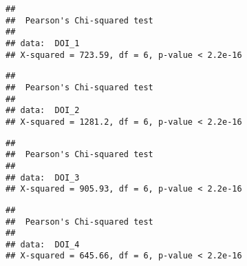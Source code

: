 \documentclass[
]{article}
\newenvironment{Shaded}{\begin{snugshade}}{\end{snugshade}}
\newcommand{\DataTypeTok}[1]{\textcolor[rgb]{0.13,0.29,0.53}{#1}}
\newcommand{\DecValTok}[1]{\textcolor[rgb]{0.00,0.00,0.81}{#1}}
\newcommand{\KeywordTok}[1]{\textcolor[rgb]{0.13,0.29,0.53}{\textbf{#1}}}
\newcommand{\NormalTok}[1]{#1}
\newcommand{\OperatorTok}[1]{\textcolor[rgb]{0.81,0.36,0.00}{\textbf{#1}}}
\newcommand{\OtherTok}[1]{\textcolor[rgb]{0.56,0.35,0.01}{#1}}
\begin{document}
\begin{verbatim}
## 
##  Pearson's Chi-squared test
## 
## data:  DOI_1
## X-squared = 723.59, df = 6, p-value < 2.2e-16
\end{verbatim}

\begin{Shaded}
\end{Shaded}

\begin{verbatim}
## 
##  Pearson's Chi-squared test
## 
## data:  DOI_2
## X-squared = 1281.2, df = 6, p-value < 2.2e-16
\end{verbatim}

\begin{Shaded}
\end{Shaded}

\begin{verbatim}
## 
##  Pearson's Chi-squared test
## 
## data:  DOI_3
## X-squared = 905.93, df = 6, p-value < 2.2e-16
\end{verbatim}

\begin{Shaded}
\end{Shaded}

\begin{verbatim}
## 
##  Pearson's Chi-squared test
## 
## data:  DOI_4
## X-squared = 645.66, df = 6, p-value < 2.2e-16
\end{verbatim}
\end{document}
